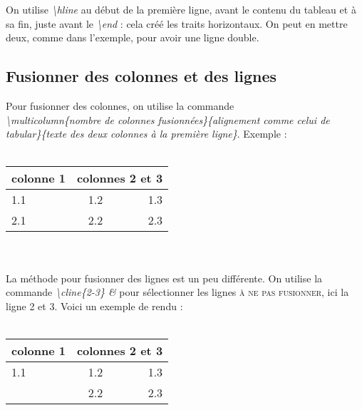 \documentclass[a4paper, 8pt]{article}
\begin{document}
On utilise \textit{\textbackslash hline} au début de la première ligne, avant le contenu du tableau et à sa fin, juste avant le \textit{\textbackslash end} : cela créé les traits horizontaux. On peut en mettre deux, comme dans l'exemple, pour avoir une ligne double.

\subsection{Fusionner des colonnes et des lignes}
Pour fusionner des colonnes, on utilise la commande \\
\textit{\textbackslash multicolumn\{nombre de colonnes fusionnées\}\{alignement comme celui de tabular\}\{texte des deux colonnes à la première ligne\}}. Exemple :\\ \\

\begin{tabular}{|l|c|r|}
   \hline
   colonne 1 & \multicolumn{2}{c|}{colonnes 2 et 3} \\
   \hline
   1.1 & 1.2 & 1.3 \\
   \hline
   2.1 & 2.2 & 2.3 \\
   \hline
\end{tabular}\\ \\

La méthode pour fusionner des lignes est un peu différente. On utilise la commande \textit{\textbackslash cline\{2-3\} \&} pour sélectionner les lignes \textsc{à ne pas fusionner}, ici la ligne 2 et 3.
Voici un exemple de rendu : \\ \\

\begin{tabular}{|l|c|r|} 
   \hline
    colonne 1 & \multicolumn{2}{c|}{colonnes 2 et 3} \\
    \hline
    1.1 & 1.2 & 1.3 \\
    \cline{2-3} 
        & 2.2 & 2.3 \\
    \hline
\end{tabular}
\end{document}
